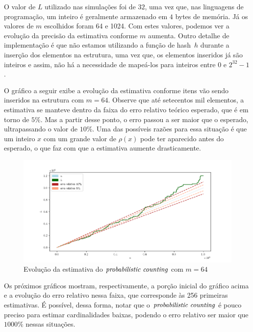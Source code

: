 O valor de $L$ utilizado nas simulações foi de $32$, uma vez que, nas linguagens de programação, um inteiro é geralmente 
armazenado em $4$ bytes de memória. Já os valores de $m$ escolhidos foram 64 e 1024. Com estes valores, podemos ver 
a evolução da precisão da estimativa conforme $m$ aumenta. Outro detalhe de implementação é que não estamos utilizando a 
função de hash~$h$ durante a inserção dos elementos na estrutura, uma vez que, os elementos inseridos já são inteiros e 
assim, não há a necessidade de mapeá-los para inteiros entre $0$ e $2^{32} - 1$.

O gráfico a seguir exibe a evolução da estimativa conforme itens vão sendo inseridos na estrutura com $m = 64$. Observe 
que até setecentos mil elementos, a estimativa se manteve dentro da faixa do erro relativo teórico esperado, que é em 
torno de $5\%$. Mas a partir desse ponto, o erro passou a ser maior que o esperado, ultrapassando o valor de $10\%$. 
Uma das possíveis razões para essa situação é que um inteiro $x$ com um grande valor de $\rho(x)$ pode ter aparecido 
antes do esperado, o que faz com que a estimativa aumente drasticamente.

\begin{figure}
  \centering
  \includegraphics[scale=0.50]{figuras/pcounting-estimate-64.png}
	\caption{Evolução da estimativa do $\textit{probabilistic counting}$ com $m = 64$}
  \label{fig:pcounting:64}
\end{figure}

\newpage
Os próximos gráficos mostram, respectivamente, a porção inicial do gráfico acima e a evolução do erro relativo nessa 
faixa, que corresponde às 256 primeiras estimativas. É possível, dessa forma, notar que o $\textit{probabilistic counting}$ é pouco preciso 
para estimar cardinalidades baixas, podendo o erro relativo ser maior que $1000\%$ nessas situações.

